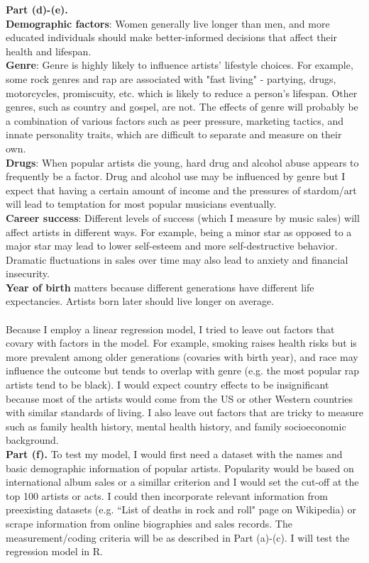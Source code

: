 \documentclass[letterpaper,12pt]{article}
\theoremstyle{definition}
\begin{document}
\noindent
\textbf {Part (d)-(e).}\\
\noindent
\textbf{Demographic factors}: Women generally live longer than men, and more educated individuals should make better-informed decisions that affect their health and lifespan. \\
\textbf{Genre}: Genre is highly likely to influence artists' lifestyle choices. For example, some rock genres and rap are associated with "fast living" - partying, drugs, motorcycles, promiscuity, etc. which is likely to reduce a person's lifespan. Other genres, such as country and gospel, are not. The effects of genre will probably be a combination of various factors such as peer pressure, marketing tactics, and innate personality traits, which are difficult to separate and measure on their own. \\
\textbf{Drugs}: When popular artists die young, hard drug and alcohol abuse appears to frequently be a factor. Drug and alcohol use may be influenced by genre but I expect that having a certain amount of income and the pressures of stardom/art will lead to temptation for most popular musicians eventually.\\
\textbf{Career success}: Different levels of success (which I measure by music sales) will affect artists in different ways. For example, being a minor star as opposed to a major star may lead to lower self-esteem and more self-destructive behavior. Dramatic fluctuations in sales over time may also lead to anxiety and financial insecurity. \\
\textbf{Year of birth} matters because different generations have different life expectancies. Artists born later should live longer on average.\\
\\
Because I employ a linear regression model, I tried to leave out factors that covary with factors in the model. For example, smoking raises health risks but is more prevalent among older generations (covaries with birth year), and race may influence the outcome but tends to overlap with genre (e.g. the most popular rap artists tend to be black). I would expect country effects to be insignificant because most of the artists would come from the US or other Western countries with similar standards of living. I also leave out factors that are tricky to measure such as family health history, mental health history, and family socioeconomic background.\\

\noindent
\textbf {Part (f).}
To test my model, I would first need a dataset with the names and basic demographic information of popular artists. Popularity would be based on international album sales or a simillar criterion and I would set the cut-off at the top 100 artists or acts. I could then incorporate relevant information from preexisting datasets (e.g. ``List of deaths in rock and roll" page on Wikipedia) or scrape information from online biographies and sales records. The measurement/coding criteria will be as described in Part (a)-(c). I will test the regression model in R.
\end{document}
